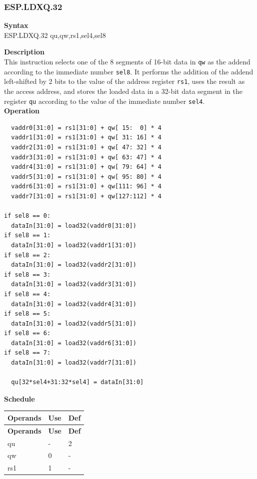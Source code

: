 \newpage
\subsubsection{ESP.LDXQ.32}\label{instruction:ESPLDXQ32}
\textbf{Syntax}\\
ESP.LDXQ.32 qu,qw,rs1,sel4,sel8

\textbf{Description}\\
This instruction selects one of the 8 segments of 16-bit data in \lstinline{qw} as the addend according to the immediate number \lstinline{sel8}. It performs the addition of the addend left-shifted by 2 bits to the value of the address register \lstinline{rs1}, uses the result as the access address, and stores the loaded data in a 32-bit data segment in the register \lstinline{qu} according to the value of the immediate number \lstinline{sel4}. \\
\textbf{Operation}
\begin{lstlisting}
  vaddr0[31:0] = rs1[31:0] + qw[ 15:  0] * 4
  vaddr1[31:0] = rs1[31:0] + qw[ 31: 16] * 4
  vaddr2[31:0] = rs1[31:0] + qw[ 47: 32] * 4
  vaddr3[31:0] = rs1[31:0] + qw[ 63: 47] * 4
  vaddr4[31:0] = rs1[31:0] + qw[ 79: 64] * 4
  vaddr5[31:0] = rs1[31:0] + qw[ 95: 80] * 4
  vaddr6[31:0] = rs1[31:0] + qw[111: 96] * 4
  vaddr7[31:0] = rs1[31:0] + qw[127:112] * 4

if sel8 == 0:
  dataIn[31:0] = load32(vaddr0[31:0])
if sel8 == 1:
  dataIn[31:0] = load32(vaddr1[31:0])
if sel8 == 2:
  dataIn[31:0] = load32(vaddr2[31:0])
if sel8 == 3:
  dataIn[31:0] = load32(vaddr3[31:0])
if sel8 == 4:
  dataIn[31:0] = load32(vaddr4[31:0])
if sel8 == 5:
  dataIn[31:0] = load32(vaddr5[31:0])
if sel8 == 6:
  dataIn[31:0] = load32(vaddr6[31:0])
if sel8 == 7:
  dataIn[31:0] = load32(vaddr7[31:0])

  qu[32*sel4+31:32*sel4] = dataIn[31:0]
\end{lstlisting}

\textbf{Schedule}\\
\begin{longtable}[c]{|l|l|l|}
    \hline
    \rowcolor{lightgray}
    \textbf{Operands} & \textbf{Use} & \textbf{Def} \\\hline
    \endfirsthead
    \hline
    \rowcolor{lightgray}
     \textbf{Operands} & \textbf{Use} & \textbf{Def} \\\hline
    \endhead
    \hline
    \endfoot

  qu & - & 2 \\\hline
  qw & 0 & - \\\hline
  rs1 & 1 & -

\end{longtable}

